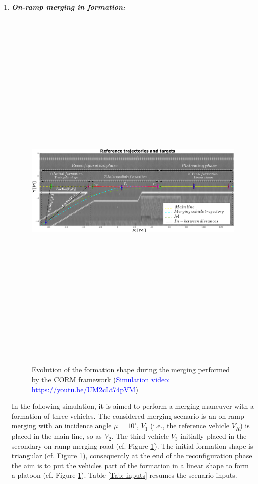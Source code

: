 \begin{enumerate}
    \item \textbf{\textit{On-ramp merging in formation:}} 
    
        \begin{figure}[!h]
        \centering 
        \includegraphics[width=14cm,height=18cm,keepaspectratio]{chapters/Chapitre_5/Figures/CORM/MergingSimulation.pdf}
        \caption{Evolution of the formation shape during the merging performed by the CORM framework (\textcolor{blue}{Simulation video: https://youtu.be/UM2cLt74pVM})}
        \label{fig:CORM: formation_shape}
        \end{figure}

    In the following simulation, it is aimed to perform a merging maneuver with a formation of three vehicles. The considered merging scenario is an on-ramp merging with an incidence angle $\mu=10^\circ $, $V_1$ (i.e., the reference vehicle $V_R$) is placed in the main line, so as $V_2$. The third vehicle $V_3$ initially placed in the secondary on-ramp merging road (cf. Figure \ref{fig:CORM: formation_shape}). The initial formation shape is triangular (cf. Figure \ref{fig:CORM: formation_shape}), consequently at the end of the reconfiguration phase the aim is to put the vehicles part of the formation in a linear shape to form a platoon (cf. Figure \ref{fig:CORM: formation_shape}). Table \ref{Tab: inputs} resumes the scenario inputs. 


\end{enumerate}
